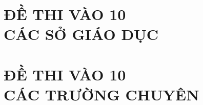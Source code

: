\documentclass[12pt,a4paper,oneside]{book}
\begin{document}
\chapter*{ĐỀ THI VÀO 10\\
{\fontsize{40}{5}\selectfont CÁC SỞ GIÁO DỤC}}

    
     
      
       
     
     
   
      
      
       
        
       


\chapter*{ĐỀ THI VÀO 10\\
{\fontsize{35}{5}\selectfont CÁC TRƯỜNG CHUYÊN}}                
       
       
       
      
 
       
       
       
      

       
       
       
      

       
       
       
      

       
       
            
\end{document}
